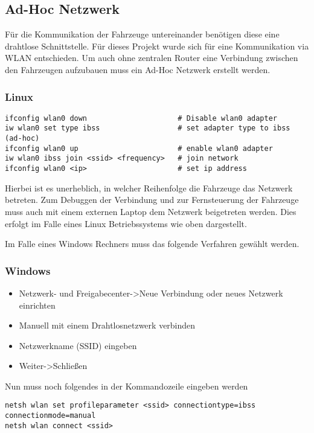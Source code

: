 \documentclass[a4paper, 12pt, titlepage]{scrartcl}
\begin{document}
	\subsection{Ad-Hoc Netzwerk}
	Für die Kommunikation der Fahrzeuge untereinander benötigen diese eine drahtlose Schnittstelle. Für dieses 
	Projekt wurde sich für eine Kommunikation via WLAN entschieden. Um auch ohne zentralen Router eine Verbindung 
	zwischen den Fahrzeugen aufzubauen muss ein Ad-Hoc Netzwerk erstellt werden.
	\subsubsection*{Linux}
	\begin{lstlisting}
ifconfig wlan0 down 					# Disable wlan0 adapter
iw wlan0 set type ibss					# set adapter type to ibss (ad-hoc)
ifconfig wlan0 up						# enable wlan0 adapter
iw wlan0 ibss join <ssid> <frequency>	# join network
ifconfig wlan0 <ip>						# set ip address
	\end{lstlisting}
	Hierbei ist es unerheblich, in welcher Reihenfolge die Fahrzeuge das Netzwerk betreten. 
	Zum Debuggen der Verbindung und zur Fernsteuerung der Fahrzeuge muss auch mit einem externen Laptop dem 
	Netzwerk beigetreten werden. Dies erfolgt im Falle eines Linux Betriebssystems wie oben dargestellt.
	
	Im Falle eines Windows Rechners muss das folgende Verfahren gewählt werden.
	\subsubsection*{Windows}	
	\begin{itemize}
	\item Netzwerk- und Freigabecenter->Neue Verbindung oder neues Netzwerk einrichten
	\item Manuell mit einem Drahtlosnetzwerk verbinden
	\item Netzwerkname (SSID) eingeben
	\item Weiter->Schließen
	\end{itemize}
	Nun muss noch folgendes in der Kommandozeile eingeben werden
	\begin{lstlisting}
netsh wlan set profileparameter <ssid> connectiontype=ibss connectionmode=manual
netsh wlan connect <ssid>
	\end{lstlisting}
\end{document}
